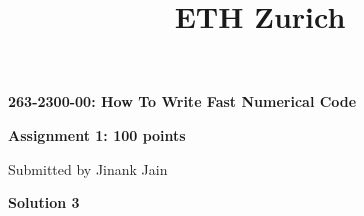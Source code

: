 \documentclass[letterpaper, 11pt]{article}
\title{ETH Zurich}
\begin{document}

\begin{center}
\Large \bf 263-2300-00: How To Write Fast Numerical Code

\Large \bf Assignment 1: 100 points

\large Submitted by Jinank Jain
\end{center}

\textbf{Solution 3}\\ \\
\bigskip

\clearpage

\end{document}
